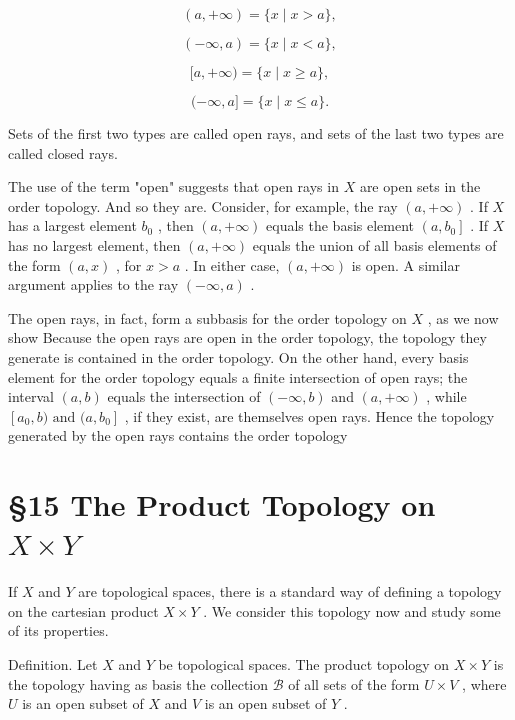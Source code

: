 \documentclass[10pt]{article}
\begin{document}
\[
\left( {a, + \infty }\right)  = \{ x \mid  x > a\} ,
\]

\[
\left( {-\infty ,a}\right)  = \{ x \mid  x < a\} ,
\]

\[
\lbrack a, + \infty ) = \{ x \mid  x \geq  a\} ,
\]

\[
( - \infty ,a\rbrack  = \{ x \mid  x \leq  a\} .
\]

Sets of the first two types are called open rays, and sets of the last two types are called closed rays.

The use of the term "open" suggests that open rays in \(X\) are open sets in the order topology. And so they are. Consider, for example, the ray \(\left( {a, + \infty }\right)\) . If \(X\) has a largest element \({b}_{0}\) , then \(\left( {a, + \infty }\right)\) equals the basis element \(\left( {a,{b}_{0}}\right\rbrack\) . If \(X\) has no largest element, then \(\left( {a, + \infty }\right)\) equals the union of all basis elements of the form \(\left( {a,x}\right)\) , for \(x > a\) . In either case, \(\left( {a, + \infty }\right)\) is open. A similar argument applies to the ray \(\left( {-\infty ,a}\right)\) .

The open rays, in fact, form a subbasis for the order topology on \(X\) , as we now show Because the open rays are open in the order topology, the topology they generate is contained in the order topology. On the other hand, every basis element for the order topology equals a finite intersection of open rays; the interval \(\left( {a,b}\right)\) equals the intersection of \(\left( {-\infty ,b}\right)\) and \(\left( {a, + \infty }\right)\) , while \(\left\lbrack  {{a}_{0},b)\text{ and }(a,{b}_{0}}\right\rbrack\) , if they exist, are themselves open rays. Hence the topology generated by the open rays contains the order topology

\section*{§15 The Product Topology on \(X \times  Y\)}

If \(X\) and \(Y\) are topological spaces, there is a standard way of defining a topology on the cartesian product \(X \times  Y\) . We consider this topology now and study some of its properties.

Definition. Let \(X\) and \(Y\) be topological spaces. The product topology on \(X \times  Y\) is the topology having as basis the collection \(\mathcal{B}\) of all sets of the form \(U \times  V\) , where \(U\) is an open subset of \(X\) and \(V\) is an open subset of \(Y\) .
\end{document}
